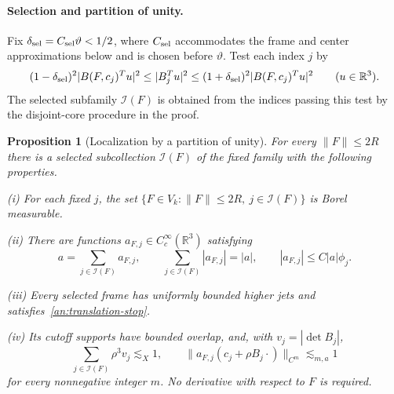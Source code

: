 \documentclass[11pt]{amsart}
\newtheorem{proposition}[theorem]{Proposition}
\theoremstyle{definition}
\theoremstyle{remark}
\numberwithin{equation}{section}
\begin{document}
\paragraph{Selection and partition of unity.} Fix $\delta_{\rm sel}=C_{\rm sel}\vartheta<1/2$, where $C_{\rm sel}$ accommodates the frame and center approximations below and is chosen before $\vartheta$. Test each index $j$ by
\[
(1-\delta_{\rm sel})^2|B(F,c_j)^Tu|^2\le |B_j^Tu|^2\le(1+\delta_{\rm sel})^2|B(F,c_j)^Tu|^2\qquad(u\in\mathbb R^3).
\]
The selected subfamily $\mathcal I(F)$ is obtained from the indices passing this test by the disjoint-core procedure in the proof.
\begin{proposition}[Localization by a partition of unity]\label{an:resolution}
For every $\|F\|\le2R$ there is a selected subcollection $\mathcal I(F)$ of the fixed family with the following properties.

\noindent\textup{(i)} For each fixed $j$, the set $\{F\in V_k:\|F\|\le2R,\ j\in\mathcal I(F)\}$ is Borel measurable.

\noindent\textup{(ii)} There are functions $a_{F,j}\in C_c^\infty(\mathbb R^3)$ satisfying
\begin{equation}\label{an:positive-reconstruction}
a=\sum_{j\in\mathcal I(F)}a_{F,j},\qquad \sum_{j\in\mathcal I(F)}|a_{F,j}|=|a|,\qquad |a_{F,j}|\le C|a|\phi_j.
\end{equation}

\noindent\textup{(iii)} Every selected frame has uniformly bounded higher jets and satisfies~\eqref{an:translation-stop}.

\noindent\textup{(iv)} Its cutoff supports have bounded overlap, and, with $v_j=|\det B_j|$,
\begin{equation}\label{an:resolution-bounds}
\sum_{j\in\mathcal I(F)}\rho^3v_j\lesssim_X 1,\qquad \|a_{F,j}(c_j+\rho B_j\cdot)\|_{C^m}\lesssim_{m,a} 1
\end{equation}
for every nonnegative integer $m$. No derivative with respect to $F$ is required.
\end{proposition}
\end{document}
